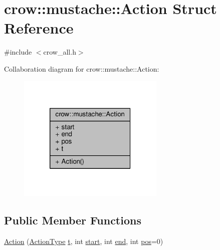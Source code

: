 \hypertarget{structcrow_1_1mustache_1_1_action}{\section{crow\-:\-:mustache\-:\-:Action Struct Reference}
\label{structcrow_1_1mustache_1_1_action}
}


{\ttfamily \#include $<$crow\-\_\-all.\-h$>$}



Collaboration diagram for crow\-:\-:mustache\-:\-:Action\-:
\nopagebreak
\begin{figure}[H]
\begin{center}
\leavevmode
\includegraphics[width=198pt]{structcrow_1_1mustache_1_1_action__coll__graph}
\end{center}
\end{figure}
\subsection*{Public Member Functions}
\begin{DoxyCompactItemize}
\item 
\hyperlink{structcrow_1_1mustache_1_1_action_a5c4481d7b58c9c1185ca90976dc5319c}{Action} (\hyperlink{namespacecrow_1_1mustache_aeb8da2ae9d8d9fe55f6ab0a7455dd667}{Action\-Type} \hyperlink{structcrow_1_1mustache_1_1_action_aed7c3e6311655c446b56c31210e27ff4}{t}, int \hyperlink{structcrow_1_1mustache_1_1_action_a643c89b2d81bfc2d2eedfca0cb119068}{start}, int \hyperlink{structcrow_1_1mustache_1_1_action_ac0daea6290bb2ca9c9c87c3fb163ce7d}{end}, int \hyperlink{structcrow_1_1mustache_1_1_action_a1af3f38c04cdc0978c2a788eeda81eab}{pos}=0)
\end{DoxyCompactItemize}
